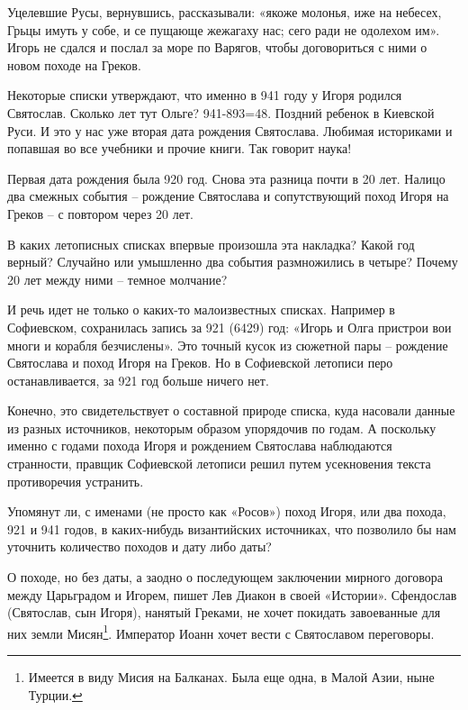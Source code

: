 Уцелевшие Русы, вернувшись, рассказывали: «якоже молонья, иже на небесех, Грьцы имуть у собе, и се пущающе жежагаху нас; сего ради не одолехом им». Игорь не сдался и послал за море по Варягов, чтобы договориться с ними о новом походе на Греков.

Некоторые списки утверждают, что именно в 941 году у Игоря родился Святослав. Сколько лет тут Ольге? 941-893=48. Поздний ребенок в Киевской Руси. И это у нас уже вторая дата рождения Святослава. Любимая историками и попавшая во все учебники и прочие книги. Так говорит наука!

Первая дата рождения была 920 год. Снова эта разница почти в 20 лет. Налицо два смежных события – рождение Святослава и сопутствующий поход Игоря на Греков – с повтором через 20 лет.

В каких летописных списках впервые произошла эта накладка? Какой год верный? Случайно или умышленно два события размножились в четыре? Почему 20 лет между ними – темное молчание?

И речь идет не только о каких-то малоизвестных списках. Например в Софиевском, сохранилась запись за 921 (6429) год: «Игорь и Олга пристрои вои многи и корабля безчислены». Это точный кусок из сюжетной пары – рождение Святослава и поход Игоря на Греков. Но в Софиевской летописи перо останавливается, за 921 год больше ничего нет. 

Конечно, это свидетельствует о составной природе списка, куда насовали данные из разных источников, некоторым образом упорядочив по годам. А поскольку именно с годами похода Игоря и рождением Святослава наблюдаются странности, правщик Софиевской летописи решил путем усекновения текста противоречия устранить.

Упомянут ли, с именами (не просто как «Росов») поход Игоря, или два похода, 921 и 941 годов, в каких-нибудь византийских источниках, что позволило бы нам уточнить количество походов и дату либо даты?

О походе, но без даты, а заодно о последующем заключении мирного договора между Царьградом и  Игорем, пишет Лев Диакон в своей «Истории»\cite{diakon01}. Сфендослав (Святослав, сын Игоря), нанятый Греками, не хочет покидать завоеванные для них земли Мисян\footnote{Имеется в виду Мисия на Балканах. Была еще одна, в Малой Азии, ныне Турции.}. Император Иоанн хочет вести с Святославом переговоры.

